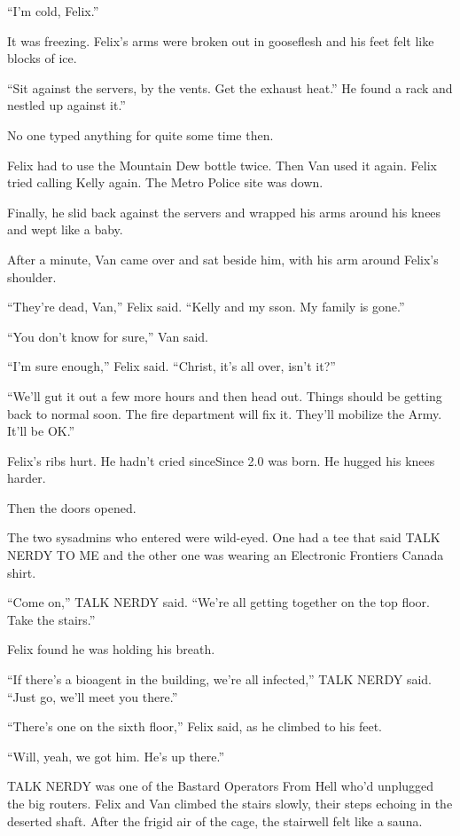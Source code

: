 “I’m cold, Felix.”

It was freezing. Felix’s arms were broken out in gooseflesh and his
feet felt like blocks of ice.

“Sit against the servers, by the vents. Get the exhaust heat.” He
found a rack and nestled up against it.”

No one typed anything for quite some time then.

\tb

Felix had to use the Mountain Dew bottle twice. Then Van used it
again. Felix tried calling Kelly again. The Metro Police site was
down.

Finally, he slid back against the servers and wrapped his arms
around his knees and wept like a baby.

After a minute, Van came over and sat beside him, with his arm
around Felix’s shoulder.

“They’re dead, Van,” Felix said. “Kelly and my s\dash{}son. My family is
gone.”

“You don’t know for sure,” Van said.

“I’m sure enough,” Felix said. “Christ, it’s all over, isn’t it?”

“We’ll gut it out a few more hours and then head out. Things should
be getting back to normal soon. The fire department will fix it.
They’ll mobilize the Army. It’ll be OK.”

Felix’s ribs hurt. He hadn’t cried since\dash{}Since 2.0 was born. He
hugged his knees harder.

Then the doors opened.

The two sysadmins who entered were wild-eyed. One had a tee that
said TALK NERDY TO ME and the other one was wearing an Electronic
Frontiers Canada shirt.

“Come on,” TALK NERDY said. “We’re all getting together on the top
floor. Take the stairs.”

Felix found he was holding his breath.

“If there’s a bioagent in the building, we’re all infected,” TALK
NERDY said. “Just go, we’ll meet you there.”

“There’s one on the sixth floor,” Felix said, as he climbed to his
feet.

“Will, yeah, we got him. He’s up there.”

TALK NERDY was one of the Bastard Operators From Hell who’d
unplugged the big routers. Felix and Van climbed the stairs slowly,
their steps echoing in the deserted shaft. After the frigid air of
the cage, the stairwell felt like a sauna.

